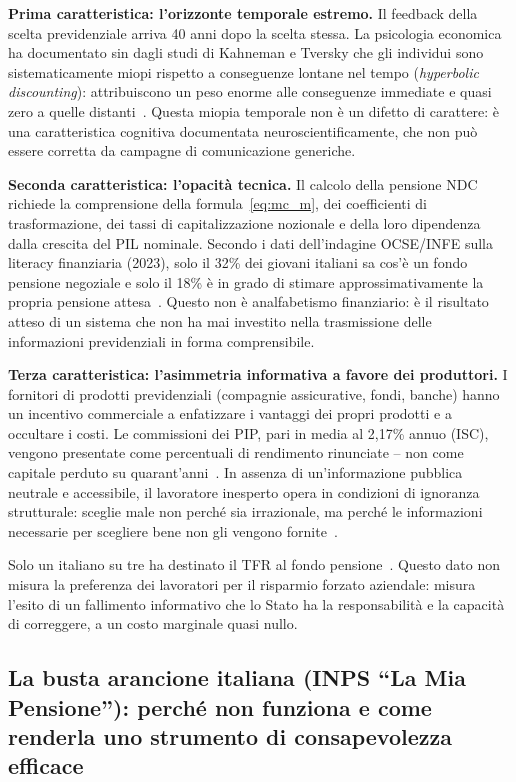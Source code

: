 \textbf{Prima caratteristica: l'orizzonte temporale estremo.} Il feedback
della scelta previdenziale arriva 40 anni dopo la scelta stessa. La
psicologia economica ha documentato sin dagli studi di Kahneman e Tversky
che gli individui sono sistematicamente miopi rispetto a conseguenze lontane
nel tempo (\emph{hyperbolic discounting}): attribuiscono un peso enorme alle
conseguenze immediate e quasi zero a quelle distanti~\cite{ThalerSunstein2008}.
Questa miopia temporale non è un difetto di carattere: è una caratteristica
cognitiva documentata neuroscientificamente, che non può essere corretta da
campagne di comunicazione generiche.

\textbf{Seconda caratteristica: l'opacità tecnica.} Il calcolo della pensione
NDC richiede la comprensione della formula~\eqref{eq:mc_m}, dei coefficienti
di trasformazione, dei tassi di capitalizzazione nozionale e della loro
dipendenza dalla crescita del PIL nominale. Secondo i dati dell'indagine
OCSE/INFE sulla literacy finanziaria (2023), solo il 32\% dei giovani
italiani sa cos'è un fondo pensione negoziale e solo il 18\% è in grado
di stimare approssimativamente la propria pensione
attesa~\cite{OECD2023, INPS2024}. Questo non è analfabetismo finanziario:
è il risultato atteso di un sistema che non ha mai investito nella
trasmissione delle informazioni previdenziali in forma comprensibile.

\textbf{Terza caratteristica: l'asimmetria informativa a favore dei
  produttori.} I fornitori di prodotti previdenziali (compagnie assicurative,
fondi, banche) hanno un incentivo commerciale a enfatizzare i vantaggi dei
propri prodotti e a occultare i costi. Le commissioni dei PIP, pari in media
al 2,17\% annuo (ISC), vengono presentate come percentuali di rendimento
rinunciate -- non come capitale perduto su quarant'anni~\cite{COVIP2024}.
In assenza di un'informazione pubblica neutrale e accessibile, il lavoratore
inesperto opera in condizioni di ignoranza strutturale: sceglie male non
perché sia irrazionale, ma perché le informazioni necessarie per scegliere
bene non gli vengono fornite~\cite{Bosi2018, ThalerSunstein2008}.

Solo un italiano su tre ha destinato il TFR al fondo pensione~\cite{COVIP2024,
INPS2024}. Questo dato non misura la preferenza dei lavoratori per il risparmio
forzato aziendale: misura l'esito di un fallimento informativo che lo Stato ha
la responsabilità e la capacità di correggere, a un costo marginale
quasi nullo.

\subsection{La busta arancione italiana (INPS ``La Mia Pensione''):
            perché non funziona e come renderla
            uno strumento di consapevolezza efficace}
\label{subsec:busta_arancione}

